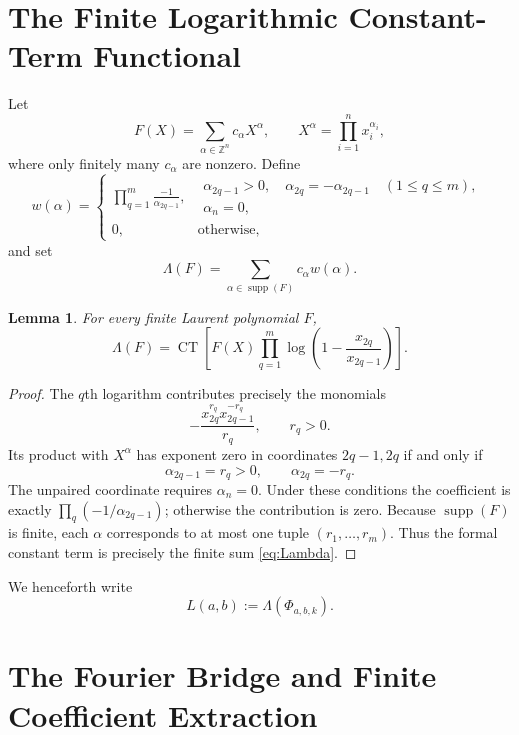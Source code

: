 \documentclass[11pt,a4paper]{article}
\newtheorem{lemma}[theorem]{Lemma}
\theoremstyle{definition}
\newcommand{\CT}{\operatorname{CT}}
\newcommand{\supp}{\operatorname{supp}}
\newcommand{\Z}{\mathbb Z}
\begin{document}
\section{The Finite Logarithmic Constant-Term Functional}
\label{sec:finite-functional}

Let
\[
 F(X)=\sum_{\alpha\in\Z^n}c_\alpha X^\alpha,\qquad
 X^\alpha=\prod_{i=1}^n x_i^{\alpha_i},
\]
where only finitely many $c_\alpha$ are nonzero. Define
\begin{equation}\label{eq:weight}
w(\alpha)=
\begin{cases}
\displaystyle\prod_{q=1}^{m}\frac{-1}{\alpha_{2q-1}},
 &\begin{array}{l}
 \alpha_{2q-1}>0,\quad
 \alpha_{2q}=-\alpha_{2q-1}\quad(1\le q\le m),\\[-2pt]
 \alpha_n=0,
 \end{array}\\[9pt]
0,&\text{otherwise},
\end{cases}
\end{equation}
and set
\begin{equation}\label{eq:Lambda}
 \Lambda(F)=\sum_{\alpha\in\supp(F)}c_\alpha w(\alpha).
\end{equation}

\begin{lemma}\label{lem:formal-ct}
For every finite Laurent polynomial $F$,
\[
\Lambda(F)=
\CT\!\left[
F(X)\prod_{q=1}^{m}
\log\!\left(1-\frac{x_{2q}}{x_{2q-1}}\right)
\right].
\]
\end{lemma}

\begin{proof}
The $q$th logarithm contributes precisely the monomials
\[
 -\frac{x_{2q}^{r_q}x_{2q-1}^{-r_q}}{r_q},
 \qquad r_q>0.
\]
Its product with $X^\alpha$ has exponent zero in coordinates
$2q-1,2q$ if and only if
\[
 \alpha_{2q-1}=r_q>0,\qquad
 \alpha_{2q}=-r_q.
\]
The unpaired coordinate requires $\alpha_n=0$. Under these conditions
the coefficient is exactly
$\prod_q(-1/\alpha_{2q-1})$; otherwise the contribution is zero.
Because $\supp(F)$ is finite, each $\alpha$ corresponds to at most one
tuple $(r_1,\ldots,r_m)$. Thus the formal constant term is precisely the
finite sum \eqref{eq:Lambda}.
\end{proof}

We henceforth write
\[
  L(a,b):=\Lambda(\Phi_{a,b,k}).
\]

\section{The Fourier Bridge and Finite Coefficient Extraction}
\label{sec:fourier}
\end{document}
